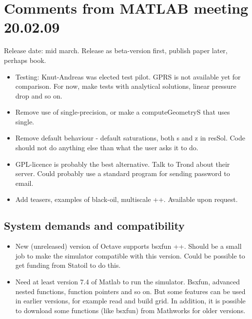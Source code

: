 \documentclass[11pt,twoside,english]{scrartcl}
\newcommand{\MATLAB}  {\textsc{MATLAB}}
\begin{document}
\section{Comments from {\MATLAB} meeting 20.02.09}

Release date: mid march. Release as beta-version first, publish paper
later, perhaps book.
 

\begin{itemize}

\item Testing: Knut-Andreas was elected test pilot. 
GPRS is not available yet for comparison. For now, make tests with analytical solutions,
linear pressure drop and so on. 


\item 
Remove use of single-precision, or make a computeGeometryS that uses
single. 


\item
Remove default behaviour - default saturations, both s and z in
resSol. Code should not do anything else than what the user asks it to
do. 

\item
GPL-licence is probably the best alternative. Talk to Trond about
their server. Could probably use a standard program for sending password to email. 

\item
Add teasers, examples of black-oil, multiscale ++. Available upon
request. 

\end{itemize}

\subsection{System demands and compatibility}

\begin{itemize}

\item
New (unreleased) version of Octave supports bsxfun ++. Should be a
small job to make the simulator compatible with this version. Could be
possible to get funding from Statoil to do this. 

\item
Need at least version 7.4 of Matlab to run the simulator. Bsxfun, advanced nested
functions, function pointers and so on. But some features can be used
in earlier versions, for example read and build grid. In addition, it
is possible to download some functions (like bsxfun) from Mathworks
for older versions. 
\end{itemize}
\end{document}
